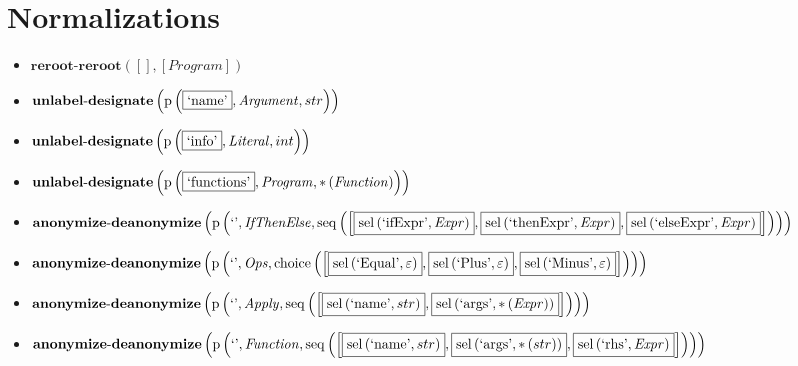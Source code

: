 \section{Normalizations}
{\footnotesize\begin{itemize}
\item $\mathbf{reroot\text{-}reroot}\left([],[\mathit{Program}]\right)$
\item $\mathbf{unlabel\text{-}designate}\\\left(\mathrm{p}\left(\fbox{\text{`name'}},\mathit{Argument},str\right)\right)$
\item $\mathbf{unlabel\text{-}designate}\\\left(\mathrm{p}\left(\fbox{\text{`info'}},\mathit{Literal},int\right)\right)$
\item $\mathbf{unlabel\text{-}designate}\\\left(\mathrm{p}\left(\fbox{\text{`functions'}},\mathit{Program},{*}\left(\mathit{Function}\right)\right)\right)$
\item $\mathbf{anonymize\text{-}deanonymize}\\\left(\mathrm{p}\left(\text{`'},\mathit{IfThenElse},\mathrm{seq}\left(\left[\fbox{$\mathrm{sel}\left(\text{`ifExpr'},\mathit{Expr}\right)$}, \fbox{$\mathrm{sel}\left(\text{`thenExpr'},\mathit{Expr}\right)$}, \fbox{$\mathrm{sel}\left(\text{`elseExpr'},\mathit{Expr}\right)$}\right]\right)\right)\right)$
\item $\mathbf{anonymize\text{-}deanonymize}\\\left(\mathrm{p}\left(\text{`'},\mathit{Ops},\mathrm{choice}\left(\left[\fbox{$\mathrm{sel}\left(\text{`Equal'},\varepsilon\right)$}, \fbox{$\mathrm{sel}\left(\text{`Plus'},\varepsilon\right)$}, \fbox{$\mathrm{sel}\left(\text{`Minus'},\varepsilon\right)$}\right]\right)\right)\right)$
\item $\mathbf{anonymize\text{-}deanonymize}\\\left(\mathrm{p}\left(\text{`'},\mathit{Apply},\mathrm{seq}\left(\left[\fbox{$\mathrm{sel}\left(\text{`name'},str\right)$}, \fbox{$\mathrm{sel}\left(\text{`args'},{*}\left(\mathit{Expr}\right)\right)$}\right]\right)\right)\right)$
\item $\mathbf{anonymize\text{-}deanonymize}\\\left(\mathrm{p}\left(\text{`'},\mathit{Function},\mathrm{seq}\left(\left[\fbox{$\mathrm{sel}\left(\text{`name'},str\right)$}, \fbox{$\mathrm{sel}\left(\text{`args'},{*}\left(str\right)\right)$}, \fbox{$\mathrm{sel}\left(\text{`rhs'},\mathit{Expr}\right)$}\right]\right)\right)\right)$

\end{itemize}}
